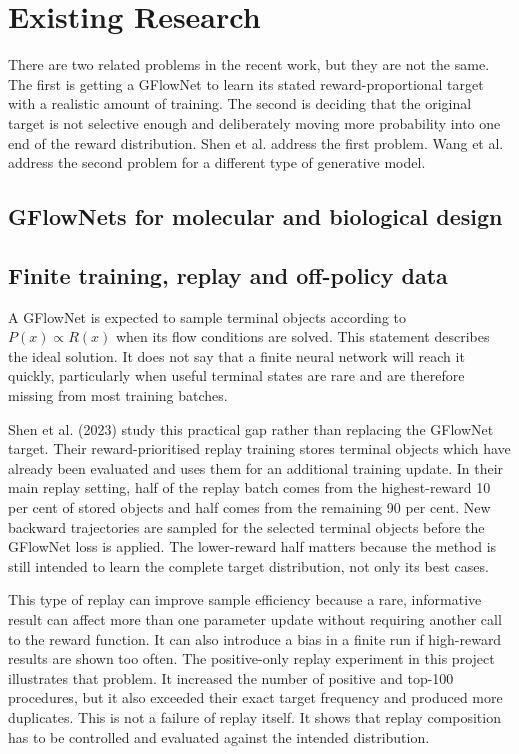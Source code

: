\documentclass{article}
\begin{document}
\section{Existing Research}

There are two related problems in the recent work, but they are not the same. The first is getting a GFlowNet to learn its stated reward-proportional target with a realistic amount of training. The second is deciding that the original target is not selective enough and deliberately moving more probability into one end of the reward distribution. Shen et al. address the first problem. Wang et al. address the second problem for a different type of generative model.

\subsection{GFlowNets for molecular and biological design}

\subsection{Finite training, replay and off-policy data}

A GFlowNet is expected to sample terminal objects according to $P(x)\propto R(x)$ when its flow conditions are solved. This statement describes the ideal solution. It does not say that a finite neural network will reach it quickly, particularly when useful terminal states are rare and are therefore missing from most training batches.

Shen et al. (2023) study this practical gap rather than replacing the GFlowNet target. Their reward-prioritised replay training stores terminal objects which have already been evaluated and uses them for an additional training update. In their main replay setting, half of the replay batch comes from the highest-reward 10 per cent of stored objects and half comes from the remaining 90 per cent. New backward trajectories are sampled for the selected terminal objects before the GFlowNet loss is applied. The lower-reward half matters because the method is still intended to learn the complete target distribution, not only its best cases.

This type of replay can improve sample efficiency because a rare, informative result can affect more than one parameter update without requiring another call to the reward function. It can also introduce a bias in a finite run if high-reward results are shown too often. The positive-only replay experiment in this project illustrates that problem. It increased the number of positive and top-100 procedures, but it also exceeded their exact target frequency and produced more duplicates. This is not a failure of replay itself. It shows that replay composition has to be controlled and evaluated against the intended distribution.
\end{document}
